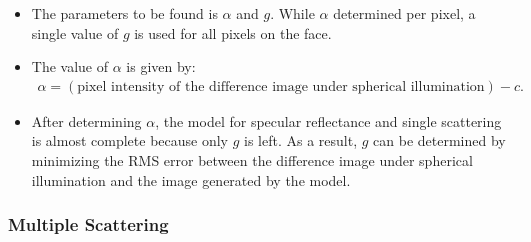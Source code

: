 \documentclass[10pt]{article}
\begin{document}
\begin{itemize}
  		\item The parameters to be found is $\alpha$ and $g$.  While $\alpha$ determined per pixel, a single value of $g$ is used for all pixels on the face.

  		\item The value of $\alpha$ is given by:
  		\begin{align*}
  			\alpha = (\mbox{pixel intensity of the difference image under spherical illumination}) - c.
  		\end{align*}

  		\item After determining $\alpha$, the model for specular reflectance and single scattering is almost complete because only $g$ is left.  As a result, $g$ can be determined by minimizing the RMS error between the difference image under spherical illumination and the image generated by the model.
  	\end{itemize}

  	\subsubsection{Multiple Scattering}
\end{document}

